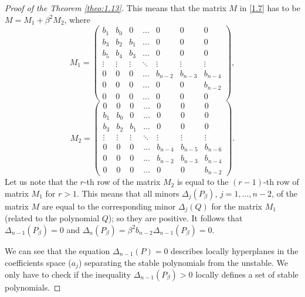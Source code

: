 \begin{proof}[Proof of the Theorem \ref{theo:1.13}]
This means that the matrix $M$ in \eqref{1.7} has to be $M = M_1 + \beta^2M_2$, where
$$M_1 = \begin{pmatrix}
b_1& b_0 & 0 & \ldots & 0  & 0 & 0\\ 
b_3& b_2 & b_1 & \ldots & 0 & 0 & 0\\ 
b_5& b_4 & b_3  & \ldots& 0 & 0 & 0\\
\vdots& \vdots & \vdots  & \ddots& \vdots & \vdots & \vdots\\ 
0& 0 & 0  & \ldots & b_{n-2} & b_{n-3} & b_{n-4}\\ 
0& 0 & 0  & \ldots & 0 & 0 & b_{n-2}\\
0& 0 & 0  & \ldots & 0 & 0 & 0
\end{pmatrix},$$
$$M_2 = \begin{pmatrix}
0 & 0 & 0 & \ldots & 0  & 0 & 0\\ 
b_1& b_0 & 0 & \ldots & 0 & 0 & 0\\ 
b_3& b_2 & b_1  & \ldots& 0 & 0 & 0\\
\vdots& \vdots & \vdots  & \ddots& \vdots & \vdots & \vdots\\ 
0& 0 & 0  & \ldots & b_{n-4} & b_{n-5} & b_{n-6}\\ 
0& 0 & 0  & \ldots & b_{n-2} & b_{n-3} & b_{n-4}\\
0& 0 & 0  & \ldots & 0 & 0 & b_{n-2}
\end{pmatrix}.$$
Let us note that the $r$-th row of the matrix $M_2$ is equal to the $(r-1)$-th row of matrix $M_1$ for $r> 1$. This means that all minors $\Delta_j(P_{\beta})$, $j = 1,\ldots , n - 2$, of the matrix $M$ are equal to the corresponding minor $\Delta_j(Q)$ for the matrix $M_1$ (related to the polynomial $Q$); so they are positive. It follows that $\Delta_{n-1}(P_{\beta}) = 0$ and $\Delta_n(P_{\beta}) = \beta^2b_{n-2} \Delta_{n-1} (P_{\beta}) = 0$.

We can see that the equation $\Delta_{n-1} (P) = 0$ describes locally hyperplanes in the coefficients space ($a_j$) separating the stable polynomials from the unstable. We only have to check if the inequality $\Delta_{n-1} (P_{\beta}) > 0$ locally defines a set of stable polynomials.


\end{proof}
